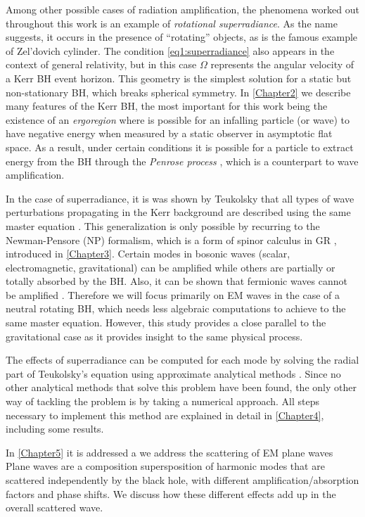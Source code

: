 Among other possible cases of radiation amplification, the phenomena worked out throughout this work is an example of \emph{rotational superradiance}. 
As the name suggests, it occurs in the presence of ``rotating'' objects, as is the famous example of Zel'dovich cylinder.
The condition \eqref{eq1:superradiance} also appears in the context of general relativity, but in this case $\Omega$ represents the angular velocity of a Kerr BH event horizon.
This geometry is the simplest solution for a static but non-stationary BH, which breaks spherical symmetry. 
In \cref{Chapter2} we describe many features of the Kerr BH, the most important for this work being the existence of an \emph{ergoregion} where is possible for an infalling particle (or wave) to have negative energy \cite{Wald2010} when measured by a static observer in asymptotic flat space.
As a result, under certain conditions it is possible for a particle to extract energy from the BH through the \emph{Penrose process} \cite{Townsend1997}, which is a counterpart to wave amplification.

In the case of superradiance, it is was shown by Teukolsky that all types of wave perturbations propagating in the Kerr background are described using the same master equation \cite{Teukolsky1972,Teukolsky1973a}.
This generalization is only possible by recurring to the Newman-Pensore (NP) formalism, which is a form of spinor calculus in GR \cite{Newman1962}, introduced in \cref{Chapter3}.
Certain modes in bosonic waves (scalar, electromagnetic, gravitational) can be amplified while others are partially or totally absorbed by the BH. Also, it can be shown that fermionic waves cannot be amplified \cite{Brito2015}.
Therefore we will focus primarily on EM waves in the case of a neutral rotating BH, which needs less algebraic computations to achieve to the same master equation.
However, this study provides a close parallel to the gravitational case as it provides insight to the same physical process.

The effects of superradiance can be computed for each mode by solving the radial part of Teukolsky's equation using approximate analytical methods \cite{Starobinsky1973a,Starobinsky1973b}.
Since no other analytical methods that solve this problem have been found, the only other way of tackling the problem is by taking a numerical approach. All steps necessary to implement this method are explained in detail in \cref{Chapter4}, including some results.

In \cref{Chapter5} it is addressed a we address the scattering of EM plane waves 
Plane waves are a composition supersposition of harmonic modes that are scattered independently by the black hole, with different amplification/absorption factors and phase shifts. We discuss how these different effects add up in the overall scattered wave.

